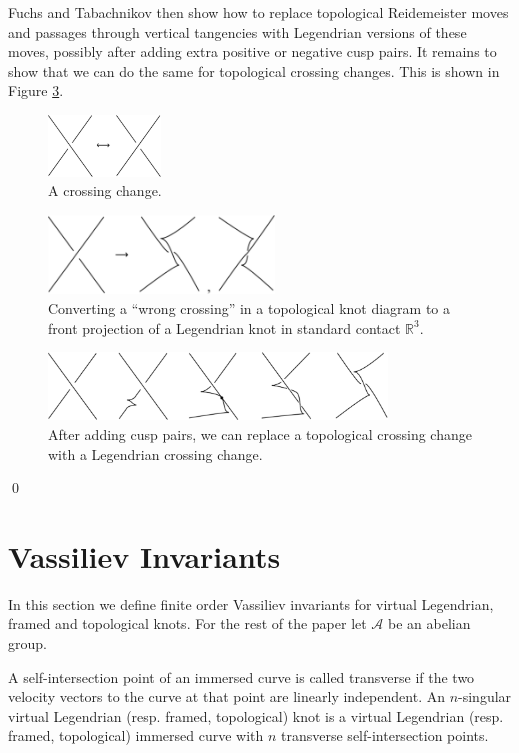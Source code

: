 Fuchs and Tabachnikov then show how to replace topological Reidemeister moves and passages through vertical tangencies with Legendrian versions of these moves, possibly after adding extra positive or negative cusp pairs.  It remains to show that we can do the same for topological crossing changes.  This is shown in Figure \ref{legendriancrossingchange.fig}.
\begin{figure}[htbp]
\centering
\includegraphics[width=3cm]{crossingchange}
\caption{A crossing change.}
\label{crossingchange.fig}
\end{figure}
\begin{figure}[htbp]
\centering
\includegraphics[width=6cm]{wrongcrossingtofrontdiagram}
\caption{Converting a ``wrong crossing'' in a topological knot diagram to a front projection of a Legendrian knot in standard contact $\mathbb{R}^3$.}
\label{wrongcrossing.fig}
\end{figure}
\begin{figure}[htbp]
\centering
\includegraphics[width=9cm]{legendriancrossingchange}
\caption{After adding cusp pairs, we can replace a topological crossing change with a Legendrian crossing change.}
\label{legendriancrossingchange.fig}
\end{figure}
\qed





\section{Vassiliev Invariants}
In this section we define finite order Vassiliev invariants for virtual Legendrian, framed and topological knots. For the rest of the paper let $\mathcal{A}$ be an abelian group.

A self-intersection point of an immersed curve is called transverse if the two velocity vectors to the curve at that point are linearly independent.  An $n$-singular virtual Legendrian (resp. framed, topological) knot is a virtual Legendrian (resp. framed, topological) immersed curve with $n$ transverse self-intersection points.

